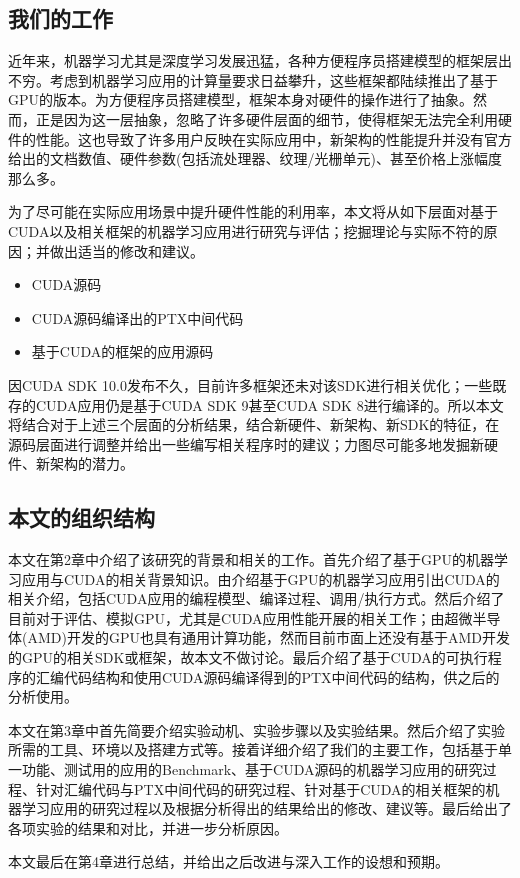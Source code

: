 \subsection{我们的工作}
\par 近年来，机器学习尤其是深度学习发展迅猛，各种方便程序员搭建模型的框架层出不穷。考虑到机器学习应用的计算量要求日益攀升，这些框架都陆续推出了基于GPU的版本。为方便程序员搭建模型，框架本身对硬件的操作进行了抽象。然而，正是因为这一层抽象，忽略了许多硬件层面的细节，使得框架无法完全利用硬件的性能。这也导致了许多用户反映在实际应用中，新架构的性能提升并没有官方给出的文档数值、硬件参数(包括流处理器、纹理/光栅单元)、甚至价格上涨幅度那么多。
\par 为了尽可能在实际应用场景中提升硬件性能的利用率，本文将从如下层面对基于CUDA以及相关框架的机器学习应用进行研究与评估；挖掘理论与实际不符的原因；并做出适当的修改和建议。
\begin{itemize}
	\item CUDA源码
	\item CUDA源码编译出的PTX中间代码
	\item 基于CUDA的框架的应用源码
\end{itemize}
\par 因CUDA SDK 10.0发布不久，目前许多框架还未对该SDK进行相关优化；一些既存的CUDA应用仍是基于CUDA SDK 9甚至CUDA SDK 8进行编译的。所以本文将结合对于上述三个层面的分析结果，结合新硬件、新架构、新SDK的特征，在源码层面进行调整并给出一些编写相关程序时的建议；力图尽可能多地发掘新硬件、新架构的潜力。

\subsection{本文的组织结构}
\par 本文在第2章中介绍了该研究的背景和相关的工作。首先介绍了基于GPU的机器学习应用与CUDA的相关背景知识。由介绍基于GPU的机器学习应用引出CUDA的相关介绍，包括CUDA应用的编程模型、编译过程、调用/执行方式。然后介绍了目前对于评估、模拟GPU，尤其是CUDA应用性能开展的相关工作；由超微半导体(AMD)开发的GPU也具有通用计算功能，然而目前市面上还没有基于AMD开发的GPU的相关SDK或框架，故本文不做讨论。最后介绍了基于CUDA的可执行程序的汇编代码结构和使用CUDA源码编译得到的PTX中间代码的结构，供之后的分析使用。
\par 本文在第3章中首先简要介绍实验动机、实验步骤以及实验结果。然后介绍了实验所需的工具、环境以及搭建方式等。接着详细介绍了我们的主要工作，包括基于单一功能、测试用的应用的Benchmark、基于CUDA源码的机器学习应用的研究过程、针对汇编代码与PTX中间代码的研究过程、针对基于CUDA的相关框架的机器学习应用的研究过程以及根据分析得出的结果给出的修改、建议等。最后给出了各项实验的结果和对比，并进一步分析原因。
\par 本文最后在第4章进行总结，并给出之后改进与深入工作的设想和预期。

